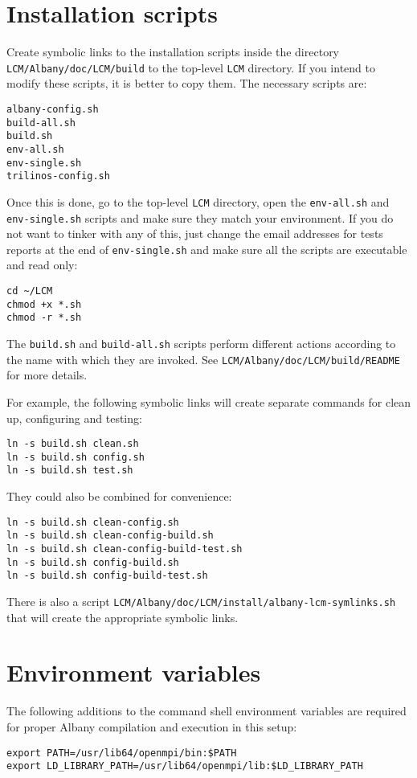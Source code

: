 \documentclass[10pt,a4paper]{article} \usepackage[utf8]{inputenc}
\begin{document}
\section{Installation scripts}
Create symbolic links to the installation scripts inside the directory
\verb+LCM/Albany/doc/LCM/build+ to the top-level \verb+LCM+
directory. If you intend to modify these scripts, it is better to copy
them. The necessary scripts are:
\begin{verbatim}
albany-config.sh
build-all.sh
build.sh
env-all.sh
env-single.sh
trilinos-config.sh
\end{verbatim}

Once this is done, go to the top-level \verb+LCM+ directory, open the
\verb+env-all.sh+ and \verb+env-single.sh+ scripts and make sure they
match your environment. If you do not want to tinker with any of this,
just change the email addresses for tests reports at the end of
\verb+env-single.sh+ and make sure all the scripts are executable and
read only:
\begin{verbatim}
cd ~/LCM
chmod +x *.sh
chmod -r *.sh
\end{verbatim}

The \verb+build.sh+ and \verb+build-all.sh+ scripts perform different
actions according to the name with which they are invoked. See
\verb+LCM/Albany/doc/LCM/build/README+ for more details. 

For example, the following symbolic links will create separate
commands for clean up, configuring and testing:
\begin{verbatim}
ln -s build.sh clean.sh
ln -s build.sh config.sh
ln -s build.sh test.sh
\end{verbatim}
They could also be combined for convenience:
\begin{verbatim}
ln -s build.sh clean-config.sh
ln -s build.sh clean-config-build.sh
ln -s build.sh clean-config-build-test.sh
ln -s build.sh config-build.sh
ln -s build.sh config-build-test.sh
\end{verbatim}
There is also a script
\verb+LCM/Albany/doc/LCM/install/albany-lcm-symlinks.sh+
that will create the appropriate symbolic links. 

\section{Environment variables}
The following additions to the command shell environment variables are
required for proper Albany compilation and execution in this setup:
\begin{verbatim}
export PATH=/usr/lib64/openmpi/bin:$PATH
export LD_LIBRARY_PATH=/usr/lib64/openmpi/lib:$LD_LIBRARY_PATH
\end{verbatim}
\end{document}
